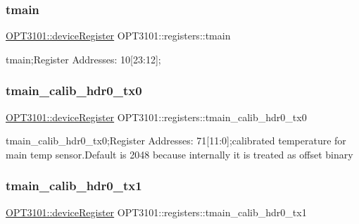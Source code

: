 \mbox{\label{class_o_p_t3101_1_1registers_a3dfd8d81d4cb04d274007deb7c6122fc}} 
\subsubsection{\texorpdfstring{tmain}{tmain}}
{\footnotesize\ttfamily \mbox{\hyperlink{class_o_p_t3101_1_1device_register}{O\+P\+T3101\+::device\+Register}} O\+P\+T3101\+::registers\+::tmain}



tmain;Register Addresses\+: 10\mbox{[}23\+:12\mbox{]}; 

\mbox{\label{class_o_p_t3101_1_1registers_a8fae5df61376ad2ea79bb9b35ff75bed}} 
\subsubsection{\texorpdfstring{tmain\+\_\+calib\+\_\+hdr0\+\_\+tx0}{tmain\_calib\_hdr0\_tx0}}
{\footnotesize\ttfamily \mbox{\hyperlink{class_o_p_t3101_1_1device_register}{O\+P\+T3101\+::device\+Register}} O\+P\+T3101\+::registers\+::tmain\+\_\+calib\+\_\+hdr0\+\_\+tx0}



tmain\+\_\+calib\+\_\+hdr0\+\_\+tx0;Register Addresses\+: 71\mbox{[}11\+:0\mbox{]};calibrated temperature for main temp sensor.\+Default is 2048 because internally it is treated as offset binary 

\mbox{\label{class_o_p_t3101_1_1registers_a68724aced807ba68873f5a6375bb611e}} 
\subsubsection{\texorpdfstring{tmain\+\_\+calib\+\_\+hdr0\+\_\+tx1}{tmain\_calib\_hdr0\_tx1}}
{\footnotesize\ttfamily \mbox{\hyperlink{class_o_p_t3101_1_1device_register}{O\+P\+T3101\+::device\+Register}} O\+P\+T3101\+::registers\+::tmain\+\_\+calib\+\_\+hdr0\+\_\+tx1}



